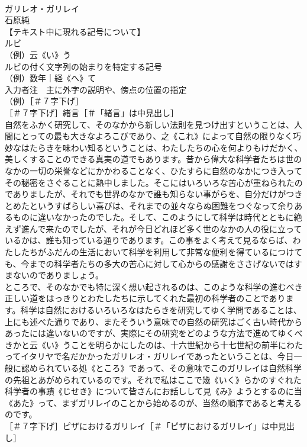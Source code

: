 \documentclass[8pt]{extreport}
\begin{document}
\begin{CJK}{UTF8}{min}
\\	ガリレオ・ガリレイ
\\	石原純
\\	【テキスト中に現れる記号について】
\\	ルビ
\\	（例）云《い》う
\\	ルビの付く文字列の始まりを特定する記号
\\	（例）数年｜経《へ》て
\\	入力者注　主に外字の説明や、傍点の位置の指定
\\	（例）［＃７字下げ］
\\	［＃７字下げ］緒言［＃「緒言」は中見出し］
\\	自然をふかく研究して、そのなかから新しい法則を見つけ出すということは、人間にとっての最も大きなよろこびであり、之《これ》によって自然の限りなく巧妙なはたらきを味わい知るということは、わたしたちの心を何よりもけだかく、美しくすることのできる真実の道でもあります。昔から偉大な科学者たちは世のなかの一切の栄誉などにかかわることなく、ひたすらに自然のなかにつき入ってその秘密をさぐることに熱中しました。そこにはいろいろな苦心が重ねられたのでありましたが、それでも世界のなかで誰も知らない事がらを、自分だけがつきとめたというすばらしい喜びは、それまでの並々ならぬ困難をつぐなって余りあるものに違いなかったのでした。そして、このようにして科学は時代とともに絶えず進んで来たのでしたが、それが今日どれほど多く世のなかの人の役に立っているかは、誰も知っている通りであります。この事をよく考えて見るならば、わたしたちがふだんの生活において科学を利用して非常な便利を得ているにつけても、今までの科学者たちの多大の苦心に対して心からの感謝をささげないではすまないのでありましょう。
\\	ところで、そのなかでも特に深く想い起されるのは、このような科学の進むべき正しい道をはっきりとわたしたちに示してくれた最初の科学者のことであります。科学は自然におけるいろいろなはたらきを研究してゆく学問であることは、上にも述べた通りであり、またそういう意味での自然の研究はごく古い時代からあったには違いないのですが、実際にその研究をどのような方法で進めてゆくべきかと云《い》うことを明らかにしたのは、十六世紀から十七世紀の前半にわたってイタリヤで名だかかったガリレオ・ガリレイであったということは、今日一般に認められている処《ところ》であって、その意味でこのガリレイは自然科学の先祖とあがめられているのです。それで私はここで幾《いく》らかのすぐれた科学者の事蹟《じせき》について皆さんにお話しして見《み》ようとするのに当《あた》って、まずガリレイのことから始めるのが、当然の順序であると考えるのです。
\\	［＃７字下げ］ピザにおけるガリレイ［＃「ピザにおけるガリレイ」は中見出し］

\end{CJK}
\end{document}
